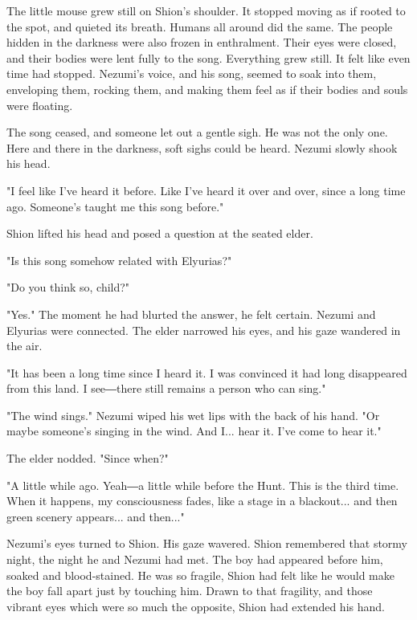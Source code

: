 The little mouse grew still on Shion's shoulder. It stopped moving as if
rooted to the spot, and quieted its breath. Humans all around did the
same. The people hidden in the darkness were also frozen in enthralment.
Their eyes were closed, and their bodies were lent fully to the song.
Everything grew still. It felt like even time had stopped. Nezumi's
voice, and his song, seemed to soak into them, enveloping them, rocking
them, and making them feel as if their bodies and souls were floating.


The song ceased, and someone let out a gentle sigh. He was not the only
one. Here and there in the darkness, soft sighs could be heard. Nezumi
slowly shook his head.

"I feel like I've heard it before. Like I've heard it over and over,
since a long time ago. Someone's taught me this song before."

Shion lifted his head and posed a question at the seated elder.

"Is this song somehow related with Elyurias?"

"Do you think so, child?"

"Yes." The moment he had blurted the answer, he felt certain. Nezumi and
Elyurias were connected. The elder narrowed his eyes, and his gaze
wandered in the air.

"It has been a long time since I heard it. I was convinced it had long
disappeared from this land. I see―there still remains a person who can
sing."

"The wind sings." Nezumi wiped his wet lips with the back of his hand.
"Or maybe someone's singing in the wind. And I... hear it. I've come to
hear it."

The elder nodded. "Since when?"

"A little while ago. Yeah―a little while before the Hunt. This is the
third time. When it happens, my consciousness fades, like a stage in a
blackout... and then green scenery appears... and then..."

Nezumi's eyes turned to Shion. His gaze wavered. Shion remembered that
stormy night, the night he and Nezumi had met. The boy had appeared
before him, soaked and blood-stained. He was so fragile, Shion had felt
like he would make the boy fall apart just by touching him. Drawn to
that fragility, and those vibrant eyes which were so much the opposite,
Shion had extended his hand.

